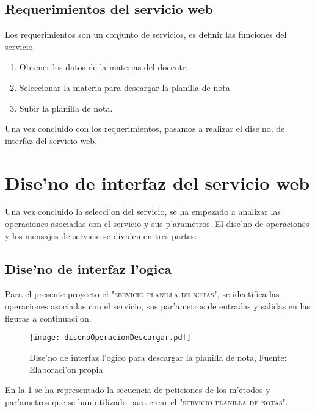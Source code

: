 \subsection{Requerimientos del servicio web}
Los requerimientos son un conjunto de servicios, es definir las funciones del servicio.
\begin{enumerate}
\item Obtener los datos de la materias del docente.
\item Seleccionar la materia para descargar la planilla de nota
\item Subir la planilla de nota.
\end{enumerate}
Una vez concluido con los requerimientos, pasamos a realizar el dise'no, de interfaz del servicio web.

\section{Dise'no de interfaz del servicio web}

Una vez concluido la selecci'on del servicio, se ha empezado a analizar las operaciones asociadas con el servicio y sus p'arametros. El dise'no de operaciones y los mensajes de servicio se dividen en tres partes: 

\subsection{Dise'no de interfaz l'ogica}
Para el presente proyecto el \textsc{"servicio planilla de notas"}, se identifica las operaciones asociadas con el servicio, sus par'ametros de entradas y salidas en las figuras a continuaci'on.

\begin{figure}
\centering
\texttt{[image: disenoOperacionDescargar.pdf]}
\captionsetup{justification=centering, margin=2cm}
\caption{Dise'no de interfaz l'ogico para descargar la planilla de nota, Fuente: Elaboraci'on propia}
\label{fig:DisenoDescargar}
\end{figure}
En la \ref{fig:DisenoDescargar} se ha representado la secuencia de peticiones de los m'etodos y par'ametros que se han utilizado para crear el \textsc{"servicio planilla de notas"}.

